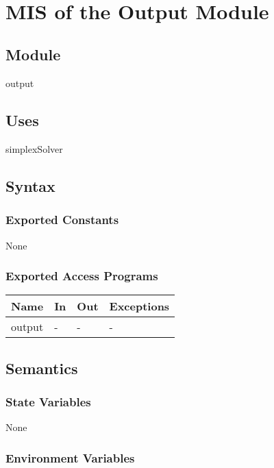 \documentclass[12pt, titlepage]{article}
\begin{document}
~\newpage

\section{MIS of the Output Module} \label{M} 

\subsection{Module}

output

\subsection{Uses}

simplexSolver 

\subsection{Syntax}

\subsubsection{Exported Constants}

None

\subsubsection{Exported Access Programs}

\begin{center}
	\begin{tabular}{p{3cm} p{3cm} p{4cm} p{4cm}}
		\hline
		\textbf{Name} & \textbf{In} & \textbf{Out} & \textbf{Exceptions} \\
		\hline
		output & - & - & - \\
		\hline
	\end{tabular}
\end{center}

\subsection{Semantics}

\subsubsection{State Variables}

None

\subsubsection{Environment Variables}
\end{document}
